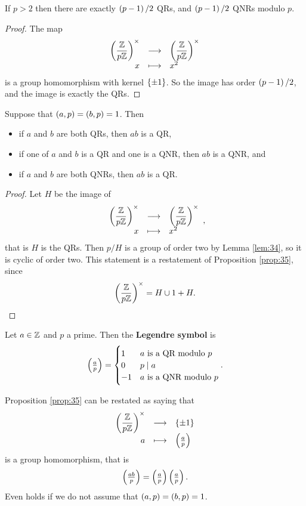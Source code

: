 \begin{lemma}
\label{lem:34}
If $ p > 2 $ then there are exactly $ \br{p - 1} / 2 $ QRs, and $ \br{p - 1} / 2 $ QNRs modulo $ p $.
\end{lemma}

\begin{proof}
The map
$$ \function{\Unit{p}}{\Unit{p}}{x}{x^2} $$
is a group homomorphism with kernel $ \cbr{\pm 1} $. So the image has order $ \br{p - 1} / 2 $, and the image is exactly the QRs.
\end{proof}

\begin{proposition}
\label{prop:35}
Suppose that $ \br{a, p} = \br{b, p} = 1 $. Then
\begin{itemize}
\item if $ a $ and $ b $ are both QRs, then $ ab $ is a QR,
\item if one of $ a $ and $ b $ is a QR and one is a QNR, then $ ab $ is a QNR, and
\item if $ a $ and $ b $ are both QNRs, then $ ab $ is a QR.
\end{itemize}
\end{proposition}

\begin{proof}
Let $ H $ be the image of
$$ \function{\Unit{p}}{\Unit{p}}{x}{x^2}, $$
that is $ H $ is the QRs. Then $ \unit{p} / H $ is a group of order two by Lemma \ref{lem:34}, so it is cyclic of order two. This statement is a restatement of Proposition \ref{prop:35}, since
$$ \Unit{p} = H \cup 1 + H. $$
\end{proof}

\pagebreak

\begin{definition}
Let $ a \in \mathbb{Z} $ and $ p $ a prime. Then the \textbf{Legendre symbol} is
$$ \jacobi{a}{p} =
\begin{cases}
1 & a \ \text{is a QR modulo} \ p \\
0 & p \mid a \\
-1 & a \ \text{is a QNR modulo} \ p
\end{cases}.
$$
\end{definition}

Proposition \ref{prop:35} can be restated as saying that
$$ \function{\Unit{p}}{\cbr{\pm 1}}{a}{\jacobi{a}{p}} $$
is a group homomorphism, that is
$$ \jacobi{ab}{p} = \jacobi{a}{p}\jacobi{a}{p}. $$
Even holds if we do not assume that $ \br{a, p} = \br{b, p} = 1 $.


